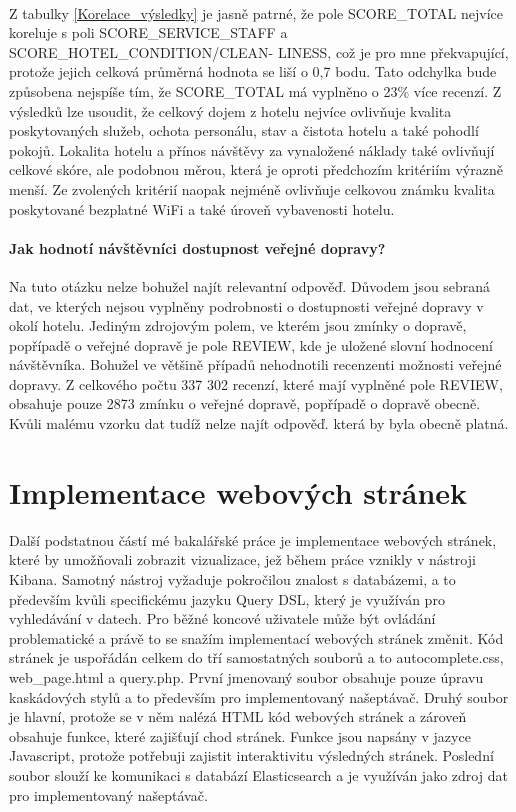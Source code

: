 \documentclass[czech,BP]{thesiskiv}
\begin{document}
 \\ \noindent
Z tabulky \ref{Korelace_výsledky} je jasně patrné, že pole SCORE\_TOTAL nejvíce koreluje s poli SCORE\_SERVICE\_STAFF a SCORE\_HOTEL\_CONDITION/CLEAN- LINESS, což je pro mne překvapující, protože jejich celková průměrná hodnota se liší o 0,7 bodu. Tato odchylka bude způsobena nejspíše tím, že SCORE\_TOTAL má vyplněno o 23\% více recenzí. Z výsledků lze usoudit, že celkový dojem z hotelu nejvíce ovlivňuje kvalita poskytovaných služeb, ochota personálu, stav a čistota hotelu a také pohodlí pokojů. Lokalita hotelu a přínos návštěvy za vynaložené náklady také ovlivňují celkové skóre, ale podobnou měrou, která je oproti předchozím kritériím výrazně menší. Ze zvolených kritérií naopak nejméně ovlivňuje celkovou známku kvalita poskytované bezplatné WiFi a také úroveň vybavenosti hotelu. 
\subsubsection{Jak hodnotí návštěvníci dostupnost veřejné dopravy?}
\label{doprava}
Na tuto otázku nelze  bohužel najít relevantní odpověď. Důvodem jsou sebraná dat, ve kterých nejsou vyplněny podrobnosti o dostupnosti veřejné dopravy v okolí hotelu. Jediným zdrojovým polem, ve kterém jsou zmínky o dopravě, popřípadě o veřejné dopravě je pole REVIEW, kde je uložené slovní hodnocení návštěvníka. Bohužel ve většině případů nehodnotili recenzenti možnosti veřejné dopravy. Z celkového počtu 337 302 recenzí, které mají vyplněné pole REVIEW, obsahuje pouze 2873 zmínku o veřejné dopravě, popřípadě o dopravě obecně. Kvůli malému vzorku dat tudíž nelze najít odpověď. která by byla obecně platná.

\chapter{Implementace webových stránek}
Další podstatnou částí mé bakalářské práce je implementace webových stránek, které by umožňovali zobrazit vizualizace, jež během práce vznikly v nástroji Kibana. Samotný nástroj vyžaduje pokročilou znalost s databázemi, a to především kvůli specifickému jazyku Query DSL, který je využíván pro vyhledávání v datech. Pro běžné koncové uživatele může být ovládání problematické a právě to se snažím implementací webových stránek změnit. Kód stránek je uspořádán celkem do tří samostatných souborů a to autocomplete.css, web\_page.html a query.php. První jmenovaný soubor obsahuje pouze úpravu kaskádových stylů a to především pro implementovaný našeptávač. Druhý soubor je hlavní, protože se v něm nalézá HTML kód webových stránek a zároveň obsahuje funkce, které zajišťují chod stránek. Funkce jsou napsány v jazyce Javascript, protože potřebuji zajistit interaktivitu výsledných stránek. Poslední soubor slouží ke komunikaci s databází Elasticsearch a je využíván jako zdroj dat pro implementovaný našeptávač.
\end{document}
